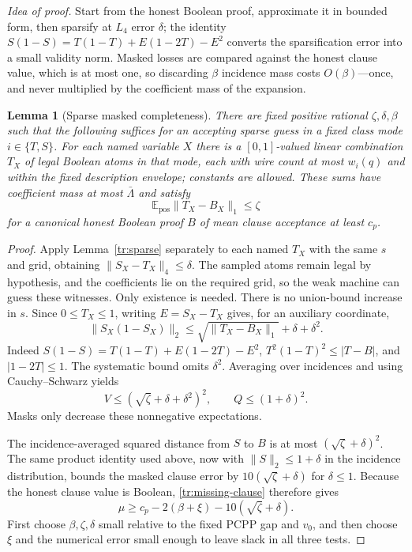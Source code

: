 \documentclass[11pt,letterpaper]{article}
\newtheorem{lemma}[theorem]{Lemma}
\theoremstyle{definition}
\theoremstyle{remark}
\begin{document}
\emph{Idea of proof.} Start from the honest Boolean proof,
approximate it in bounded form, then sparsify at $L_4$ error
$\delta$; the identity $S(1-S)=T(1-T)+E(1-2T)-E^2$ converts the
sparsification error into a small validity norm. Masked losses are
compared against the honest clause value, which is at most one, so
discarding $\beta$ incidence mass costs $O(\beta)$---once, and never
multiplied by the coefficient mass of the expansion.

\begin{lemma}[Sparse masked completeness]
\label{tr:completeness}
There are fixed positive rational $\zeta,\delta,\beta$ such that
the following suffices for an accepting sparse guess in a fixed class
mode $i\in\{T,S\}$. For each named variable $X$ there is a
$[0,1]$-valued linear combination $T_X$ of legal Boolean atoms in that
mode, each with wire count at most $w_i(q)$ and within the fixed
description envelope; constants are allowed. These sums have
coefficient mass at most $\bar\Lambda$ and satisfy
\[
 \mathbb E_{\mathrm{pos}}\|T_X-B_X\|_1\le\zeta
\]
for a canonical honest Boolean proof $B$ of mean clause acceptance
at least $c_p$.
\end{lemma}

\begin{proof}
Apply Lemma~\ref{tr:sparse} separately to each named $T_X$ with
the same $s$ and grid, obtaining $\|S_X-T_X\|_4\le\delta$.
The sampled atoms remain legal by hypothesis, and the coefficients
lie on the required grid, so the weak machine can guess these witnesses.
Only existence is needed.
There is no union-bound increase in $s$.
Since $0\le T_X\le1$, writing $E=S_X-T_X$ gives, for an auxiliary
coordinate,
\[
 \|S_X(1-S_X)\|_2
 \le \sqrt{\|T_X-B_X\|_1}+\delta+\delta^2.
\]
Indeed $S(1-S)=T(1-T)+E(1-2T)-E^2$,
$T^2(1-T)^2\le|T-B|$, and $|1-2T|\le1$.
The systematic bound omits $\delta^2$. Averaging over incidences
and using Cauchy--Schwarz yields
\[
 V\le(\sqrt\zeta+\delta+\delta^2)^2,
 \qquad Q\le(1+\delta)^2.
\]
Masks only decrease these nonnegative expectations.

The incidence-averaged squared distance from $S$ to $B$ is at most
$(\sqrt\zeta+\delta)^2$. The same product identity used above,
now with $\|S\|_2\le1+\delta$ in the incidence distribution,
bounds the masked clause error by
$10(\sqrt\zeta+\delta)$ for $\delta\le1$.
Because the honest clause value is Boolean,
\eqref{tr:missing-clause} therefore gives
\[
 \mu\ge c_p-2(\beta+\xi)-10(\sqrt\zeta+\delta).
\]
First choose $\beta,\zeta,\delta$ small relative to the fixed PCPP
gap and $v_0$, and then choose $\xi$ and the numerical error small
enough to leave slack in all three tests.
\end{proof}
\end{document}
